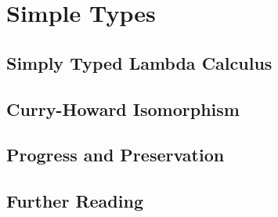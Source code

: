 \chapter{Simple Types}

\section{Simply Typed Lambda Calculus}

\section{Curry-Howard Isomorphism}

\section{Progress and Preservation}

\section{Further Reading}

